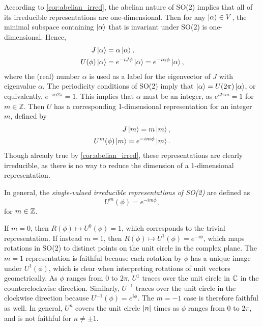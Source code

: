     According to \cref{cor:abelian_irred}, the abelian nature of SO(2) implies that all of its irreducible representations are one-dimensional. Then for any $\ket{\alpha}\in V$, the minimal subspace containing $\ket{\alpha}$ that is invariant under SO(2) is one-dimensional. Hence,
    \begin{align*}
        J\ket{\alpha} &= \alpha\ket{\alpha}, \\
        U(\phi)\ket{\alpha} &= e^{-iJ\phi}\ket{\alpha} = e^{-i\alpha\phi}\ket{\alpha},
    \end{align*}
    where the (real) number $\alpha$ is used as a label for the eigenvector of $J$ with eigenvalue $\alpha$. The periodicity conditions of SO(2) imply that $\ket{\alpha} = U(2\pi)\ket{\alpha}$, or equivalently, $e^{-i\alpha2\pi} = 1$. This implies that $\alpha$ must be an integer, as $e^{i2\pi m} = 1$ for $m\in\mathbb{Z}$. Then $U$ has a corresponding 1-dimensional representation for an integer $m$, defined by
    \begin{align*}
        J\ket{m} = m\ket{m}, \\
        U^m(\phi)\ket{m} = e^{-im\phi}\ket{m}.
    \end{align*}
    Though already true by \cref{cor:abelian_irred}, these representations are clearly irreducible, as there is no way to reduce the dimension of a 1-dimensional representation.
    
    In general, the \textit{single-valued irreducible representations of SO(2)} are defined as
    \begin{equation}
        U^m(\phi) = e^{-im\phi},
    \end{equation}
    for $m\in\mathbb{Z}$.

    If $m=0$, then $R(\phi)\mapsto U^0(\phi) = 1$, which corresponds to the trivial representation. If instead $m=1$, then $R(\phi)\mapsto U^1(\phi) = e^{-i\phi}$, which maps rotations in SO(2) to distinct points on the unit circle in the complex plane. The $m=1$ representation is faithful because each rotation by $\phi$ has a unique image under $U^1(\phi)$, which is clear when interpreting rotations of unit vectors geometrically. As $\phi$ ranges from 0 to $2\pi$, $U^1$ traces over the unit circle in $\mathbb{C}$ in the counterclockwise direction. Similarly, $U^{-1}$ traces over the unit circle in the clockwise direction because $U^{-1}(\phi)=e^{i\phi}$. The $m=-1$ case is therefore faithful as well. In general, $U^n$ covers the unit circle $\left|n\right|$ times as $\phi$ ranges from 0 to $2\pi$, and is not faithful for $n\neq\pm1$.

